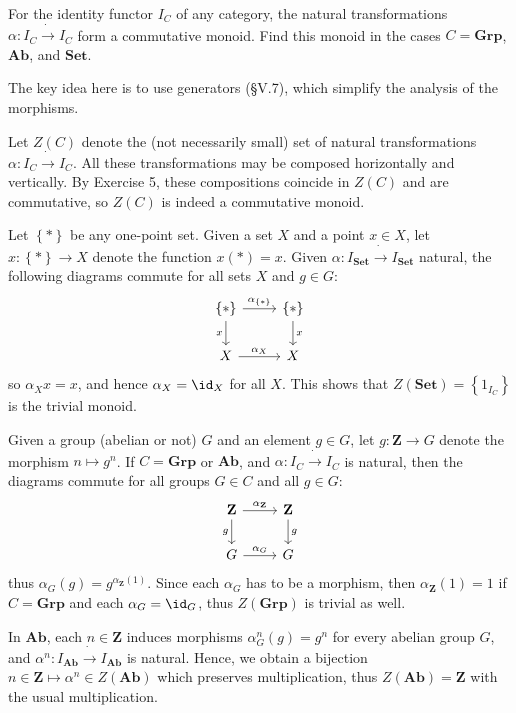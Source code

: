 \begin{exercise}
For the identity functor $I_C$ of any category, the natural transformations $\alpha:I_C\dot{\to} I_C$ form a commutative monoid. Find this monoid in the cases $C=\mathbf{Grp}$, $\mathbf{Ab}$, and $\mathbf{Set}$.
\end{exercise}
\begin{solution}
The key idea here is to use generators (\S V.7), which simplify the analysis of the morphisms.

Let $Z(C)$ denote the (not necessarily small) set of natural transformations $\alpha:I_C\dot{\to}I_C$. All these transformations may be composed horizontally and vertically. By Exercise 5, these compositions coincide in $Z(C)$ and are commutative, so $Z(C)$ is indeed a commutative monoid.

Let $\left\{*\right\}$ be any one-point set. Given a set $X$ and a point $x\in X$, let $x:\left\{*\right\}\to X$ denote the function $x(*)=x$. Given $\alpha:I_\mathbf{Set}\dot{\to}I_\mathbf{Set}$ natural, the following diagrams commute for all sets $X$ and $g\in G$:
\vspace{-5pt}\[\begin{tikzcd}
\left\{*\right\}\arrow[r,"\alpha_{\left\{*\right\}}"]\arrow[d,"x",swap] & \left\{*\right\}\arrow[d,"x"]\\
X\arrow[r,"\alpha_X"] &X
\end{tikzcd}\vspace{-5pt}\]
so $\alpha_Xx=x$, and hence $\alpha_X=\id_X$ for all $X$. This shows that $Z(\mathbf{Set})=\left\{1_{I_C}\right\}$ is the trivial monoid.

Given a group (abelian or not) $G$ and an element $g\in G$, let $g:\mathbf{Z}\to G$ denote the morphism $n\mapsto g^n$. If $C=\mathbf{Grp}$ or $\mathbf{Ab}$, and $\alpha:I_C\dot{\to}I_C$ is natural, then the diagrams commute for all groups $G\in C$ and all $g\in G$:
\vspace{-5pt}\[\begin{tikzcd}
\mathbf{Z}\arrow[r,"\alpha_\mathbf{Z}"]\arrow[d,"g",swap] & \mathbf{Z}\arrow[d,"g"]\\
G\arrow[r,"\alpha_G"] &G
\end{tikzcd}\vspace{-5pt}\]
thus $\alpha_G(g)=g^{\alpha_\mathbf{Z}(1)}$. Since each $\alpha_G$ has to be a morphism, then $\alpha_\mathbf{Z}(1)=1$ if $C=\mathbf{Grp}$ and each $\alpha_G=\id_G$, thus $Z(\mathbf{Grp})$ is trivial as well.

In $\mathbf{Ab}$, each $n\in \mathbf{Z}$ induces morphisms $\alpha^n_G(g)=g^n$ for every abelian group $G$, and $\alpha^n:I_\mathbf{Ab}\dot{\to}I_\mathbf{Ab}$ is natural. Hence, we obtain a bijection $n\in\mathbf{Z}\mapsto \alpha^n\in Z(\mathbf{Ab})$ which preserves multiplication, thus $Z(\mathbf{Ab})=\mathbf{Z}$ with the usual multiplication.
\end{solution}

